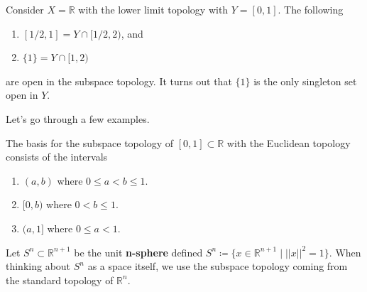   \begin{example}
    Consider $X = \mathbb{R}$ with the lower limit topology with $Y = [0, 1]$. The following 
    \begin{enumerate}
      \item $[1/2, 1] = Y \cap [1/2, 2)$, and 
      \item $\{1\} = Y \cap [1, 2)$
    \end{enumerate}
    are open in the subspace topology. It turns out that $\{1\}$ is the only singleton set open in $Y$. 
  \end{example}

  Let's go through a few examples. 

  \begin{example}
    The basis for the subspace topology of $[0, 1] \subset \mathbb{R}$ with the Euclidean topology consists of the intervals 
    \begin{enumerate}
      \item $(a, b)$ where $0 \leq a < b \leq 1$. 
      \item $[0, b)$ where $0 < b \leq 1$. 
      \item $(a, 1]$ where $0 \leq a < 1$. 
    \end{enumerate}
  \end{example} 

  \begin{example} 
    Let $S^n \subset \mathbb{R}^{n+1}$ be the unit \textbf{n-sphere} defined $S^n \coloneqq \{x \in \mathbb{R}^{n+1} \mid ||x||^2 = 1 \}$. When thinking about $S^n$ as a space itself, we use the subspace topology coming from the standard topology of $\mathbb{R}^n$. 
  \end{example}

